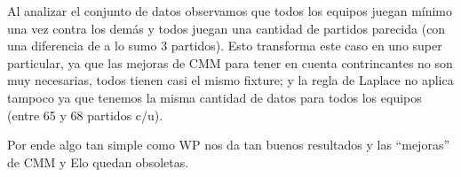 Al analizar el conjunto de datos observamos que todos los equipos juegan mínimo una vez contra los demás y todos juegan una cantidad de partidos parecida (con una diferencia de a lo sumo 3 partidos). Esto transforma este caso en uno super particular, ya que las mejoras de CMM para tener en cuenta contrincantes no son muy necesarias, todos tienen casi el mismo fixture; y la regla de Laplace no aplica tampoco ya que tenemos la misma cantidad de datos para todos los equipos (entre 65 y 68 partidos c/u).

Por ende algo tan simple como WP nos da tan buenos resultados y las ``mejoras'' de CMM y Elo quedan obsoletas.
